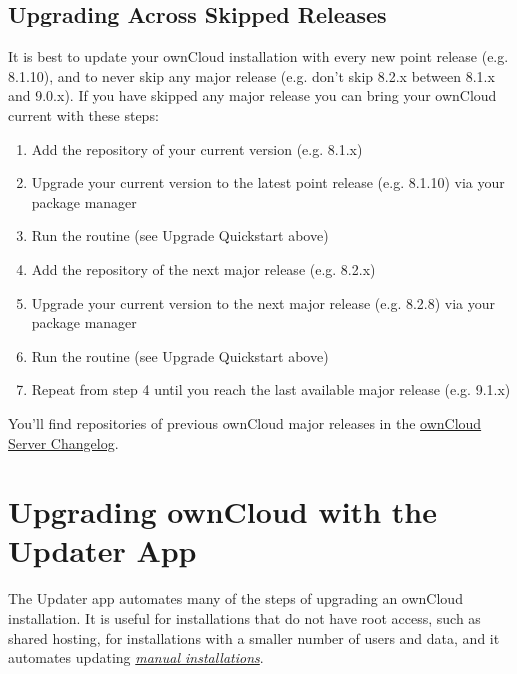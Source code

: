 \documentclass[letterpaper,10pt,english]{sphinxmanual}
\begin{document}
\subsection{Upgrading Across Skipped Releases}
\label{maintenance/package_upgrade:upgrading-across-skipped-releases}\label{maintenance/package_upgrade:skipped-release-upgrade-label}
It is best to update your ownCloud installation with every new point release (e.g. 8.1.10),
and to never skip any major release (e.g. don't skip 8.2.x between 8.1.x and 9.0.x). If you
have skipped any major release you can bring your ownCloud current with these steps:
\begin{enumerate}
\item {} 
Add the repository of your current version (e.g. 8.1.x)

\item {} 
Upgrade your current version to the latest point release (e.g. 8.1.10) via your package manager

\item {} 
Run the  routine (see Upgrade Quickstart above)

\item {} 
Add the repository of the next major release (e.g. 8.2.x)

\item {} 
Upgrade your current version to the next major release (e.g. 8.2.8) via your package manager

\item {} 
Run the  routine (see Upgrade Quickstart above)

\item {} 
Repeat from step 4 until you reach the last available major release (e.g. 9.1.x)

\end{enumerate}

You'll find repositories of previous ownCloud major releases in the \href{https://owncloud.org/changelog/}{ownCloud Server Changelog}.


\section{Upgrading ownCloud with the Updater App}
\label{maintenance/update::doc}\label{maintenance/update:upgrading-owncloud-with-the-updater-app}
The Updater app automates many of the steps of upgrading an ownCloud
installation. It is useful for installations that do not have root access,
such as shared hosting, for installations with a smaller number of users
and data, and it automates updating
{\hyperref[installation/source_installation::doc]{\emph{\emph{manual installations}}}}.
\end{document}
